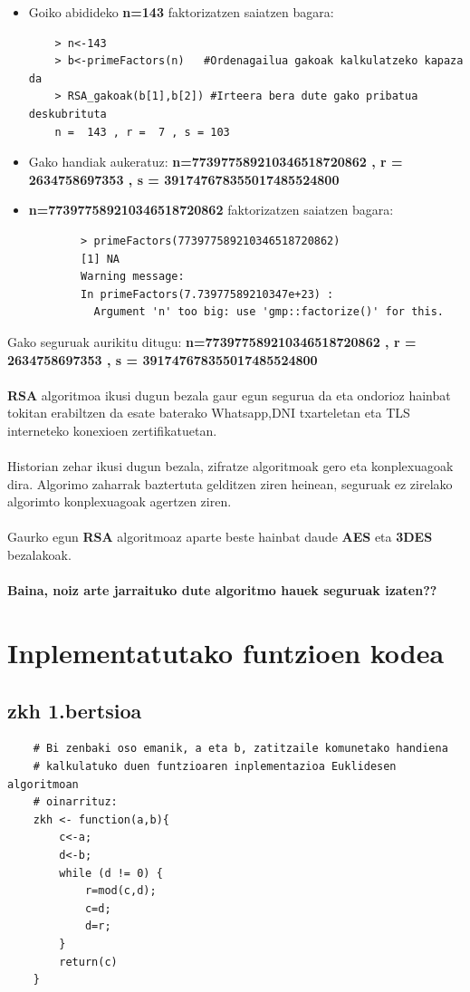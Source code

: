 \documentclass[12pt]{basque-book}
\begin{document}
\begin{itemize}
    \item Goiko abidideko \textbf{n=143} faktorizatzen saiatzen bagara:
    \begin{verbatim}
    > n<-143
    > b<-primeFactors(n)   #Ordenagailua gakoak kalkulatzeko kapaza da
    > RSA_gakoak(b[1],b[2]) #Irteera bera dute gako pribatua deskubrituta
    n =  143 , r =  7 , s = 103
    \end{verbatim}
    \newpage
    \item Gako handiak aukeratuz: \textbf{n=773977589210346518720862 , r =  2634758697353 , s = 391747678355017485524800}
    \item\textbf{n=773977589210346518720862} faktorizatzen saiatzen bagara:
    \begin{verbatim}
        > primeFactors(773977589210346518720862)
        [1] NA
        Warning message:
        In primeFactors(7.73977589210347e+23) :
          Argument 'n' too big: use 'gmp::factorize()' for this.
    \end{verbatim}
\end{itemize}
Gako seguruak aurikitu ditugu:\newline
\textbf{n=773977589210346518720862 , r =  2634758697353\newline
, s = 391747678355017485524800}
\\\\
\textbf{RSA} algoritmoa ikusi dugun bezala gaur egun segurua da eta ondorioz hainbat tokitan erabiltzen da esate baterako Whatsapp,DNI txarteletan eta TLS interneteko konexioen zertifikatuetan.
\\\\
Historian zehar ikusi dugun bezala, zifratze algoritmoak gero eta konplexuagoak dira. Algorimo zaharrak baztertuta gelditzen ziren heinean, seguruak ez zirelako algorimto konplexuagoak agertzen ziren.
\\\\
Gaurko egun \textbf{RSA} algoritmoaz aparte beste hainbat daude \textbf{AES} eta \textbf{3DES} bezalakoak.
\\\\
\textbf{Baina, noiz arte jarraituko dute algoritmo hauek seguruak izaten??}


\chapter{Inplementatutako funtzioen kodea}
\section{zkh 1.bertsioa}
\begin{verbatim}
    # Bi zenbaki oso emanik, a eta b, zatitzaile komunetako handiena 
    # kalkulatuko duen funtzioaren inplementazioa Euklidesen algoritmoan
    # oinarrituz:
    zkh <- function(a,b){ 
        c<-a;
        d<-b;
        while (d != 0) {
            r=mod(c,d);
            c=d;
            d=r;
        }
        return(c)  
    }
\end{verbatim}
\end{document}

